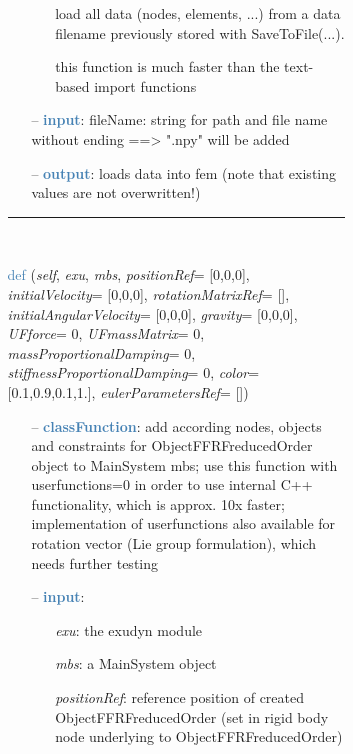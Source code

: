\begin{itemize}[leftmargin=1.4cm]
\begin{itemize}[leftmargin=1.4cm]
\begin{itemize}[leftmargin=1.4cm]
\begin{itemize}[leftmargin=0.5cm]
\begin{itemize}[leftmargin=1.4cm]
\begin{itemize}[leftmargin=1.4cm]
\begin{itemize}[leftmargin=0.5cm]
\begin{itemize}[leftmargin=0.7cm]
\begin{itemize}[leftmargin=1.2cm]
\setlength{\itemindent}{-0.7cm}
\item[]load all data (nodes, elements, ...) from a data filename previously stored with SaveToFile(...).
\item[]this function is much faster than the text-based import functions
\end{itemize}
\item[--]\textcolor{steelblue}{\bf input}: fileName: string for path and file name without ending ==> ".npy" will be added
\item[--]\textcolor{steelblue}{\bf output}: loads data into fem (note that existing values are not overwritten!)
\vspace{12pt}\end{itemize}
%
\noindent\rule{8cm}{0.75pt}\vspace{1pt} \\ 
\begin{flushleft}
\noindent \textcolor{steelblue}{def {\bf {}}}\label{sec:FEM:ObjectFFRFreducedOrderInterface:AddObjectFFRFreducedOrderWithUserFunctions}
({\it self}, {\it exu}, {\it mbs}, {\it positionRef}= [0,0,0], {\it initialVelocity}= [0,0,0], {\it rotationMatrixRef}= [], {\it initialAngularVelocity}= [0,0,0], {\it gravity}= [0,0,0], {\it UFforce}= 0, {\it UFmassMatrix}= 0, {\it massProportionalDamping}= 0, {\it stiffnessProportionalDamping}= 0, {\it color}= [0.1,0.9,0.1,1.], {\it eulerParametersRef}= [])
\end{flushleft}
\setlength{\itemindent}{0.7cm}
\begin{itemize}[leftmargin=0.7cm]
\item[--]\textcolor{steelblue}{\bf classFunction}: add according nodes, objects and constraints for ObjectFFRFreducedOrder object to MainSystem mbs; use this function with userfunctions=0 in order to use internal C++ functionality, which is approx. 10x faster; implementation of userfunctions also available for rotation vector (Lie group formulation), which needs further testing
\item[--]\textcolor{steelblue}{\bf input}: \vspace{-6pt}
\begin{itemize}[leftmargin=1.2cm]
\setlength{\itemindent}{-0.7cm}
\item[]{\it exu}: the exudyn module
\item[]{\it mbs}: a MainSystem object
\item[]{\it positionRef}: reference position of created ObjectFFRFreducedOrder (set in rigid body node underlying to ObjectFFRFreducedOrder)

\end{itemize}
\end{itemize}
\end{itemize}
\end{itemize}
\end{itemize}
\end{itemize}
\end{itemize}
\end{itemize}
\end{itemize}
